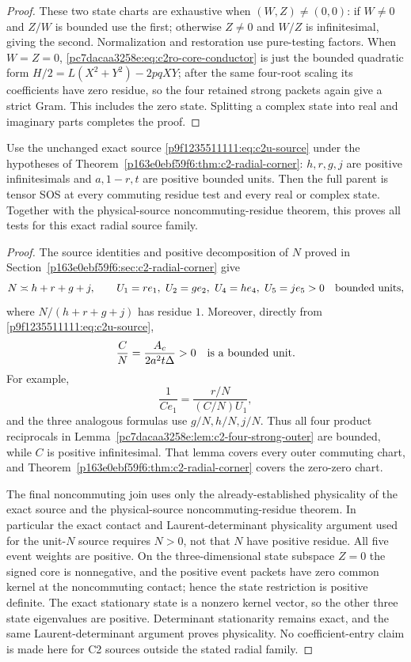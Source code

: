 \begin{proof}
These two state charts are exhaustive when $(W,Z)\ne(0,0)$: if
$W\ne0$ and $Z/W$ is bounded use the first; otherwise $Z\ne0$ and
$W/Z$ is infinitesimal, giving the second.  Normalization and restoration
use pure-testing factors.  When $W=Z=0$,
\eqref{pc7dacaa3258e:eq:c2ro-core-conductor} is just the bounded quadratic form
$H/2=L(X^2+Y^2)-2pqXY$; after the same four-root scaling its
coefficients have zero residue, so the four retained strong packets
again give a strict Gram.  This includes the zero state.  Splitting a
complex state into real and imaginary parts completes the proof.
\end{proof}

\begin{corollary}
\label{pc7dacaa3258e:cor:c2-radial-outer}
Use the unchanged exact source \eqref{p9f1235511111:eq:c2u-source} under the hypotheses
of Theorem~\ref{p163e0ebf59f6:thm:c2-radial-corner}: $h,r,g,j$ are positive
infinitesimals and $a,1-r,t$ are positive bounded units.
Then the full parent is tensor SOS at every commuting residue test and
every real or complex state.  Together with the physical-source
noncommuting-residue theorem, this proves all tests for this exact
radial source family.
\end{corollary}
\begin{proof}
The source identities and positive decomposition of $N$ proved in
Section~\ref{p163e0ebf59f6:sec:c2-radial-corner} give
\[
 N\asymp h+r+g+j,\qquad
 U_1=re_1,\ U_2=ge_2,\ U_4=he_4,\ U_5=je_5>0
 \quad\hbox{bounded units},
\]
where $N/(h+r+g+j)$ has residue $1$.  Moreover, directly from
\eqref{p9f1235511111:eq:c2u-source},
\[
 \frac CN=\frac{A_c}{2a^2t\Delta}>0
 \quad\hbox{is a bounded unit}.
\]
For example,
\[
 \frac1{Ce_1}=\frac{r/N}{(C/N)U_1},
\]
and the three analogous formulas use $g/N,h/N,j/N$.
Thus all four product reciprocals in
Lemma~\ref{pc7dacaa3258e:lem:c2-four-strong-outer} are bounded, while $C$ is positive
infinitesimal.  That lemma covers every outer commuting chart, and
Theorem~\ref{p163e0ebf59f6:thm:c2-radial-corner} covers the zero-zero chart.

The final noncommuting join uses only the already-established
physicality of the exact source and the physical-source
noncommuting-residue theorem.  In particular the exact contact and
Laurent-determinant physicality argument used for the unit-$N$ source
requires $N>0$, not that $N$ have positive residue.  All five event
weights are positive.  On the three-dimensional state subspace $Z=0$
the signed core is nonnegative, and the positive event packets have
zero common kernel at the noncommuting contact; hence the state
restriction is positive definite.  The exact stationary state is a
nonzero kernel vector, so the other three state eigenvalues are positive.
Determinant stationarity remains exact, and the same Laurent-determinant
argument proves physicality.
No coefficient-entry claim is made here for C2 sources outside the
stated radial family.
\end{proof}


